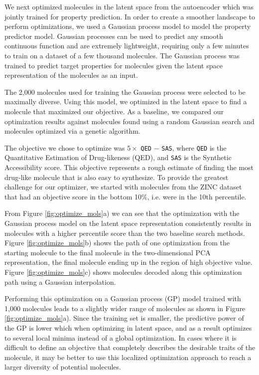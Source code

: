 We next optimized molecules in the latent space from the autoencoder which was jointly trained for property prediction. In order to create a smoother landscape to perform optimizations, we used a Gaussian process model to model the property predictor model. Gaussian processes can be used to predict any smooth continuous function\cite{rasmussen2006gaussian} and are extremely lightweight, requiring only a few minutes to train on a dataset of a few thousand molecules. The Gaussian process was trained to predict target properties for molecules given the latent space representation of the molecules as an input.

The 2,000 molecules used for training the Gaussian process were selected to be maximally diverse. Using this model, we optimized in the latent space to find a molecule that maximized our objective. As a baseline, we compared our optimization results against molecules found using a random Gaussian search and molecules optimized via a genetic algorithm.

The objective we chose to optimize was $5 \times$ \texttt{QED} $-$ \texttt{SAS}, where \texttt{QED} is the Quantitative Estimation of Drug-likeness (QED)\cite{bickerton2012quantifying}, and \texttt{SAS} is the Synthetic Accessibility score\cite{Ertl2009estimation}. This objective represents a rough estimate of finding the most drug-like molecule that is also easy to synthesize. To provide the greatest challenge for our optimizer, we started with molecules from the ZINC dataset that had an objective score in the bottom 10\%, i.e. were in the 10th percentile.

From Figure \ref{fig:optimize_mols}a) we can see that the optimization with the Gaussian process model on the latent space representation consistently results in molecules with a higher percentile score than the two baseline search methods. Figure \ref{fig:optimize_mols}b) shows the path of one optimization from the starting molecule to the final molecule in the two-dimensional PCA representation, the final molecule ending up in the region of high objective value. Figure \ref{fig:optimize_mols}c)  shows molecules decoded along this optimization path using a Gaussian interpolation.

Performing this optimization on a Gaussian process (GP) model trained with 1,000 molecules leads to a slightly wider range of molecules as shown in Figure \ref{fig:optimize_mols}a). 
  Since the training set is smaller, the predictive power of the GP is lower which when optimizing in latent space, and as a result optimizes to several local minima instead of a global optimization.  In cases where it is difficult to define an objective that completely describes the desirable traits of the molecule, it may be better to use this localized optimization approach to reach a larger diversity of potential molecules.

